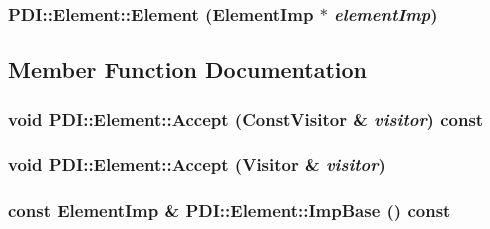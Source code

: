 \hypertarget{class_p_d_i_1_1_element_6e6bc482dd5780a39acb49571be1ae82}{
\subsubsection[{Element}]{\setlength{\rightskip}{0pt plus 5cm}PDI::Element::Element ({\bf ElementImp} $\ast$ {\em elementImp})}}
\label{class_p_d_i_1_1_element_6e6bc482dd5780a39acb49571be1ae82}




\subsection{Member Function Documentation}
\hypertarget{class_p_d_i_1_1_element_f1d0536b08a8c77d066829521097bd2d}{
\subsubsection[{Accept}]{\setlength{\rightskip}{0pt plus 5cm}void PDI::Element::Accept ({\bf ConstVisitor} \& {\em visitor}) const}}
\label{class_p_d_i_1_1_element_f1d0536b08a8c77d066829521097bd2d}


\hypertarget{class_p_d_i_1_1_element_122df676eacaec79f3ca3f9223dfa576}{
\subsubsection[{Accept}]{\setlength{\rightskip}{0pt plus 5cm}void PDI::Element::Accept ({\bf Visitor} \& {\em visitor})}}
\label{class_p_d_i_1_1_element_122df676eacaec79f3ca3f9223dfa576}


\hypertarget{class_p_d_i_1_1_element_6cd07b6afc2c4b809a830f54aff4e96c}{
\subsubsection[{ImpBase}]{\setlength{\rightskip}{0pt plus 5cm}const {\bf ElementImp} \& PDI::Element::ImpBase () const}}
\label{class_p_d_i_1_1_element_6cd07b6afc2c4b809a830f54aff4e96c}


